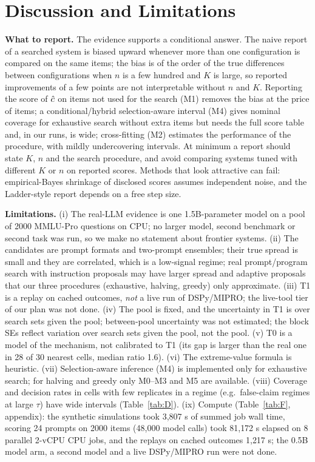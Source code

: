 \section{Discussion and Limitations}
\label{sec:discussion}
\textbf{What to report.} The evidence supports a conditional answer. The naive report of a searched system is biased upward whenever more than one configuration is compared on the same items; the bias is of the order of the true differences between configurations when $n$ is a few hundred and $K$ is large, so reported improvements of a few points are not interpretable without $n$ and $K$. Reporting the score of $\hat c$ on items not used for the search (M1) removes the bias at the price of items; a conditional/hybrid selection-aware interval (M4) gives nominal coverage for exhaustive search without extra items but needs the full score table and, in our runs, is wide; cross-fitting (M2) estimates the performance of the procedure, with mildly undercovering intervals. At minimum a report should state $K$, $n$ and the search procedure, and avoid comparing systems tuned with different $K$ or $n$ on reported scores. Methods that look attractive can fail: empirical-Bayes shrinkage of disclosed scores assumes independent noise, and the Ladder-style report depends on a free step size.

\textbf{Limitations.} (i) The real-LLM evidence is one 1.5B-parameter model on a pool of 2000 MMLU-Pro questions on CPU; no larger model, second benchmark or second task was run, so we make no statement about frontier systems. (ii) The candidates are prompt formats and two-prompt ensembles; their true spread is small and they are correlated, which is a low-signal regime; real prompt/program search with instruction proposals may have larger spread and adaptive proposals that our three procedures (exhaustive, halving, greedy) only approximate. (iii) T1 is a replay on cached outcomes, \emph{not} a live run of DSPy/MIPRO; the live-tool tier of our plan was not done. (iv) The pool is fixed, and the uncertainty in T1 is over search sets given the pool; between-pool uncertainty was not estimated; the block SEs reflect variation over search sets given the pool, not the pool. (v) T0 is a model of the mechanism, not calibrated to T1 (its gap is larger than the real one in 28 of 30 nearest cells, median ratio 1.6). (vi) The extreme-value formula is heuristic. (vii) Selection-aware inference (M4) is implemented only for exhaustive search; for halving and greedy only M0--M3 and M5 are available. (viii) Coverage and decision rates in cells with few replicates in a regime (e.g.\ false-claim regimes at large $\tau$) have wide intervals (Table~\ref{tab:D}). (ix) Compute (Table~\ref{tab:F}, appendix): the synthetic simulations took 3{,}807 s of summed job wall time, scoring 24 prompts on 2000 items (48{,}000 model calls) took 81{,}172 s elapsed on 8 parallel 2-vCPU CPU jobs, and the replays on cached outcomes 1{,}217 s; the 0.5B model arm, a second model and a live DSPy/MIPRO run were not done.
